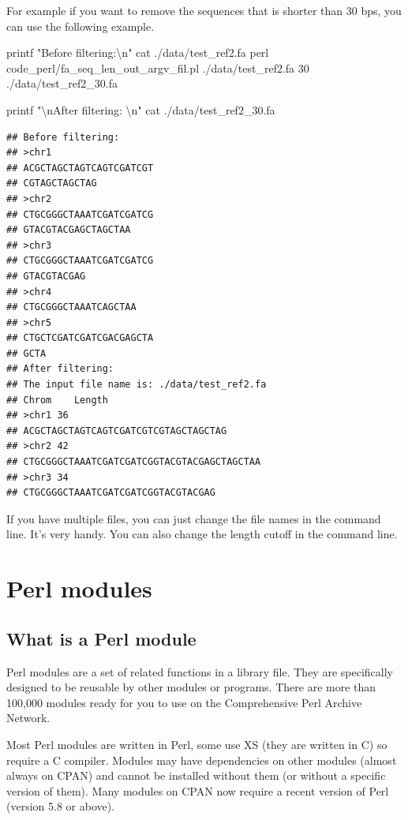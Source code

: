 \documentclass[]{book}
\makeatletter
\newenvironment{Shaded}{\begin{snugshade}}{\end{snugshade}}
\newcommand{\StringTok}[1]{\textcolor[rgb]{0.31,0.60,0.02}{#1}}
\newcommand{\FunctionTok}[1]{\textcolor[rgb]{0.00,0.00,0.00}{#1}}
\newcommand{\BuiltInTok}[1]{#1}
\newcommand{\NormalTok}[1]{#1}
\newenvironment{kframe}{%
\medskip{}
\setlength{\fboxsep}{.8em}
 \def\at@end@of@kframe{}%
 \ifinner\ifhmode%
  \def\at@end@of@kframe{\end{minipage}}%
  \begin{minipage}{\columnwidth}%
 \fi\fi%
 \def\FrameCommand##1{\hskip\@totalleftmargin \hskip-\fboxsep
 \colorbox{shadecolor}{##1}\hskip-\fboxsep
     \hskip-\linewidth \hskip-\@totalleftmargin \hskip\columnwidth}%
 \MakeFramed {\advance\hsize-\width
   \@totalleftmargin\z@ \linewidth\hsize
   \@setminipage}}%
 {\par\unskip\endMakeFramed%
 \at@end@of@kframe}
\renewenvironment{Shaded}{\begin{kframe}}{\end{kframe}}
\theoremstyle{definition}
\theoremstyle{definition}
\theoremstyle{definition}
\theoremstyle{remark}
\makeatother
\begin{document}
For example if you want to remove the sequences that is shorter than 30
bps, you can use the following example.

\begin{Shaded}
\begin{Highlighting}[]
\BuiltInTok{printf} \StringTok{"Before filtering:\textbackslash{}n"}
\FunctionTok{cat}\NormalTok{ ./data/test_ref2.fa}
\FunctionTok{perl}\NormalTok{ code_perl/fa_seq_len_out_argv_fil.pl ./data/test_ref2.fa 30 ./data/test_ref2_30.fa}

\BuiltInTok{printf} \StringTok{"\textbackslash{}nAfter filtering: \textbackslash{}n"}
\FunctionTok{cat}\NormalTok{ ./data/test_ref2_30.fa }
\end{Highlighting}
\end{Shaded}

\begin{verbatim}
## Before filtering:
## >chr1
## ACGCTAGCTAGTCAGTCGATCGT
## CGTAGCTAGCTAG
## >chr2
## CTGCGGGCTAAATCGATCGATCG
## GTACGTACGAGCTAGCTAA
## >chr3
## CTGCGGGCTAAATCGATCGATCG
## GTACGTACGAG
## >chr4
## CTGCGGGCTAAATCAGCTAA
## >chr5
## CTGCTCGATCGATCGACGAGCTA
## GCTA
## After filtering: 
## The input file name is: ./data/test_ref2.fa
## Chrom    Length
## >chr1 36
## ACGCTAGCTAGTCAGTCGATCGTCGTAGCTAGCTAG
## >chr2 42
## CTGCGGGCTAAATCGATCGATCGGTACGTACGAGCTAGCTAA
## >chr3 34
## CTGCGGGCTAAATCGATCGATCGGTACGTACGAG
\end{verbatim}

If you have multiple files, you can just change the file names in the
command line. It's very handy. You can also change the length cutoff in
the command line.

\chapter{Perl modules}\label{perl-modules}

\section{What is a Perl module}\label{what-is-a-perl-module}

Perl modules are a set of related functions in a library file. They are
specifically designed to be reusable by other modules or programs. There
are more than 100,000 modules ready for you to use on the Comprehensive
Perl Archive Network.

Most Perl modules are written in Perl, some use XS (they are written in
C) so require a C compiler. Modules may have dependencies on other
modules (almost always on CPAN) and cannot be installed without them (or
without a specific version of them). Many modules on CPAN now require a
recent version of Perl (version 5.8 or above).
\end{document}
